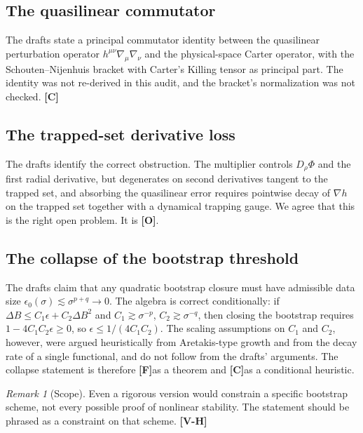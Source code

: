 \documentclass[11pt, a4paper]{article}
\newcommand{\VH}{\textcolor{vh}{\textbf{[V-H]}}}
\newcommand{\CC}{\textcolor{cc}{\textbf{[C]}}}
\newcommand{\FF}{\textcolor{ff}{\textbf{[F]}}}
\newcommand{\OO}{\textcolor{oo}{\textbf{[O]}}}
\theoremstyle{remark}
\newtheorem{remark}[theorem]{Remark}
\theoremstyle{definition}
\begin{document}
\subsection{The quasilinear commutator}

The drafts state a principal commutator identity between the quasilinear perturbation operator $h^{\mu\nu}\nabla_\mu\nabla_\nu$ and the physical-space Carter operator, with the Schouten--Nijenhuis bracket with Carter's Killing tensor as principal part. The identity was not re-derived in this audit, and the bracket's normalization was not checked. \CC

\subsection{The trapped-set derivative loss}

The drafts identify the correct obstruction. The multiplier controls $D_\rho\Phi$ and the first radial derivative, but degenerates on second derivatives tangent to the trapped set, and absorbing the quasilinear error requires pointwise decay of $\nabla h$ on the trapped set together with a dynamical trapping gauge. We agree that this is the right open problem. It is \OO.

\subsection{The collapse of the bootstrap threshold}

The drafts claim that any quadratic bootstrap closure must have admissible data size $\epsilon_0(\sigma)\lesssim\sigma^{p+q}\to0$. The algebra is correct conditionally: if $\Delta B \le C_1 \epsilon + C_2 \Delta B^2$ and $C_1 \gtrsim \sigma^{-p}$, $C_2 \gtrsim \sigma^{-q}$, then closing the bootstrap requires $1 - 4C_1C_2\epsilon \ge 0$, so $\epsilon \le 1/(4C_1C_2)$. The scaling assumptions on $C_1$ and $C_2$, however, were argued heuristically from Aretakis-type growth and from the decay rate of a single functional, and do not follow from the drafts' arguments. The collapse statement is therefore \FF as a theorem and \CC as a conditional heuristic.

\begin{remark}[Scope]
Even a rigorous version would constrain a specific bootstrap scheme, not every possible proof of nonlinear stability. The statement should be phrased as a constraint on that scheme. \VH
\end{remark}

\end{document}
